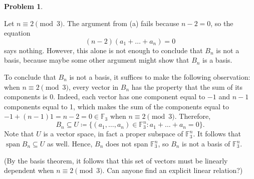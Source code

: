 \documentclass[11pt,oneside]{amsart}
\theoremstyle{definition}
\newtheorem{problem}{Problem}
\newcommand{\bF}{\mathbb{F}}
\DeclareMathOperator{\Span}{span}
\begin{document}
\begin{problem}
\begin{enumerate}[(a)]
\begin{solution}
                Let $n\equiv 2\pmod 3$. The argument from (a) fails because $n-2=0$, so the equation 
                \[(n-2)(a_1+\dots+a_n)=0\]
                says nothing. However, this alone is not enough to conclude that $B_n$ is not a basis, because maybe some other argument might show that $B_n$ is a basis.

                To conclude that $B_n$ is not a basis, it suffices to make the following observation: when $n\equiv 2\pmod 3$, every vector in $B_n$ has the property that the sum of its components is 0. Indeed, each vector has one component equal to $-1$ and $n-1$ components equal to 1, which makes the sum of the components equal to $-1+(n-1)1=n-2=0\in\bF_3$ when $n\equiv 2\pmod 3$. Therefore,
                \[B_n\subseteq U\coloneqq\{(a_1,\dots,a_n)\in\bF_3^n:a_1+\dots+a_n=0\}.\]
                Note that $U$ is a vector space, in fact a proper subspace of $\bF_3^n$. It follows that $\Span B_n\subseteq U$ as well. Hence, $B_n$ does not span $\bF_3^n$, so $B_n$ is not a basis of $\bF_3^n$.

                (By the basis theorem, it follows that this set of vectors must be linearly dependent when $n\equiv 2\pmod 3$. Can anyone find an explicit linear relation?)
            \end{solution}
        \end{enumerate}
    \end{problem}
\end{document}
